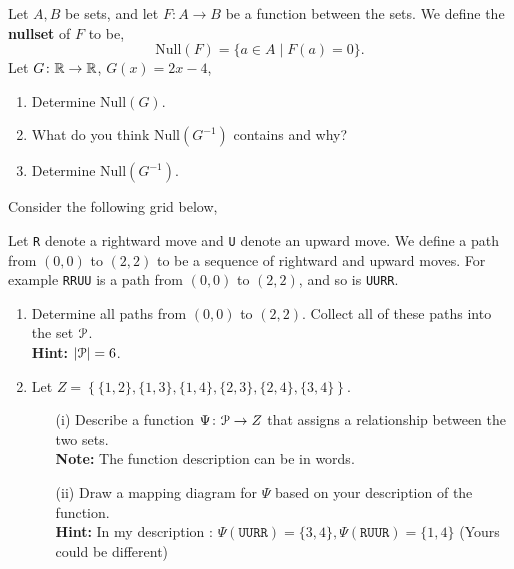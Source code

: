 \documentclass[12pt]{article} %
\begin{document}
\begin{qstn}
  Let $A,B$ be sets, and let  $F \colon A \to B$ be a function between the sets. We define the \textbf{nullset} of
  $F$ to be,
  \[
        \text{Null}(F) = \{a \in A \mid F(a) = 0\} 
  .\] 
  Let $G \colon \mathbb R \to \mathbb R$, $G(x) = 2x - 4$,
   \begin{enumerate}[label=(\alph*)]
     \item Determine $\text{Null}(G)$.
     \item What do you think $\text{Null}(G^{-1})$ contains and why?
     \item Determine $\text{Null}(G^{-1})$.
  \end{enumerate}
  
\end{qstn}

\begin{qstn}
  Consider the following grid below,
  \begin{center}
  \end{center}

  Let \texttt{R} denote a rightward move and \texttt{U} denote an upward move. We define a path from $(0,0)$ to  $(2,2)$ to be a 
  sequence of rightward and upward moves. For example \texttt{RRUU} is a path from $(0,0)$ to  $(2,2)$, and so is
  \texttt{UURR}.

  \begin{enumerate}[label=(\alph*)]
    \item Determine all paths from $(0,0)$ to  $(2,2)$. Collect all of these paths into the set $\EuScript{P}$.\\
      \textbf{Hint:} $\left|\EuScript{P}\right| = 6$.
    \item Let $Z = \left\{ \{1,2\}, \{1,3\}, \{1,4\}, \{2,3\}, \{2,4\} , \{3,4\}\right\} $.
      \begin{enumerate}[label=(\alph*)]
        \item [(i)]Describe a function $\Psi \colon \EuScript{P} \to Z$ that assigns a 
          relationship between the two sets.\\
          \textbf{Note:} The function description can be in words.
        \item [(ii)] Draw a mapping diagram for $\Psi$ based on your description of the function.\\
          \textbf{Hint:} In my description : $\Psi(\texttt{UURR}) = \{3,4\}, \Psi(\texttt{RUUR}) = \{1,4\} $
          (Yours could be different)\\


\end{enumerate}
\end{enumerate}
\end{qstn}
\end{document}
